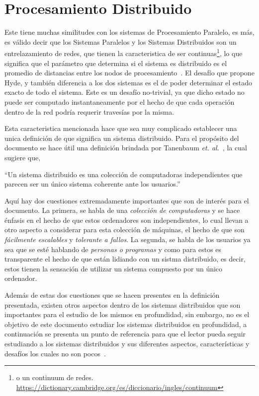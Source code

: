 \section{Procesamiento Distribuido}
\label{sec:procesamiento_distribuido}

Este tiene muchas similitudes con los sistemas de Procesamiento Paralelo, es
más, es válido decir que los Sistemas Paralelos y los Sistemas Distribuidos son
un entrelazamiento de redes, que tienen la caracteristica de ser
continuas\footnote{
o un \gls{continuum} de redes.
\url{https://dictionary.cambridge.org/es/diccionario/ingles/continuum}}, lo que
significa que el parámetro que determina si el sistema es distribuido es el promedio de
distancias entre los nodos de procesamiento~\cite{hyde98}. El desafío que
propone Hyde, y también diferencia a los dos sistemas es el de poder determinar el
estado exacto de todo el sistema. Este es un desafío no-trivial, ya que dicho
estado no puede ser computado
instantaneamente por el hecho de que cada operación dentro de la red podría
requerir travesías por la misma.

Esta caracteristica mencionada hace que sea muy complicado establecer una unica
definición de que significa un sistema distribuido. Para el propósito del
documento se hace útil una definición brindada por 
Tanenbaum \textit{et. al.}~\cite{tanenbaum2007a}, la cual sugiere que,

\begin{displayquote}
  ``Un sistema distribuido es una colección de computadoras independientes que
  parecen ser un único sistema coherente ante los usuarios.''
\end{displayquote}

Aquí hay dos cuestiones extremadamente importantes que son de interés para el
documento. La primera, se habla de una \textit{colección de computadoras} y se
hace énfasis en el hecho de que estos ordenadores son independientes, lo cual
llevan a otro aspecto a considerar para esta colección de máquinas, el hecho de
que son \textit{fácilmente escalables} y \textit{tolerante a fallos}. La
segunda, se habla de los usuarios ya sea que se esté hablando de \textit{personas
o programas} y como para estos es transparente el hecho de que están lidiando con
un sistma distribuido, es decir, estos tienen la sensación de utilizar un
sistema compuesto por un único ordenador.

Además de estas dos cuestiones que se hacen presentes en la definición
presentada, existen otros aspectos dentro de los sistemas distribuidos que
son importantes para el estudio de los mismos en profundidad, sin embargo, no es el
objetivo de este documento estudiar los sistemas distribuidos en profundidad,
a continuación se presenta un punto de referencia para que el
lector pueda seguir estudiando a los sistemas distribuidos y sus diferentes
aspectos, características y desafíos los cuales no son
pocos~\cite{tanenbaum1994, tanenbaum2007, siberschatz2013}.

\printbibliography[keyword={recomendacion_sistemas_distribuidos}, title={Referencias para 
el estudio de Sistemas Distribuidos}]
